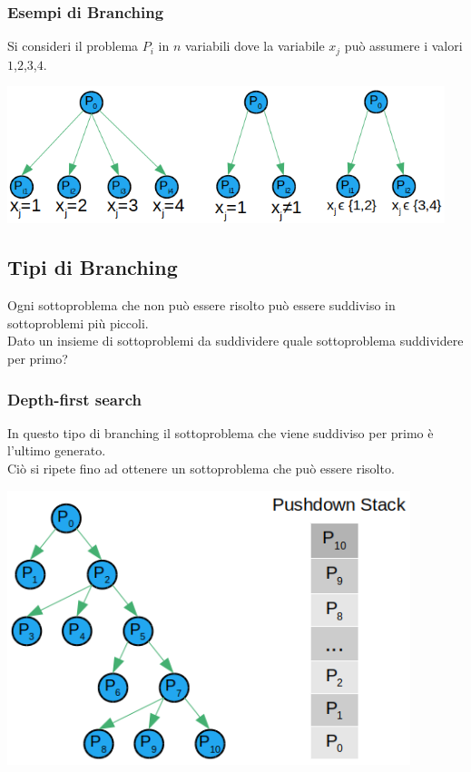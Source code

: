 \subsubsection{Esempi di Branching}
Si consideri il problema $P_{i}$ in $n$ variabili dove la variabile $x_{j}$ può assumere i valori $1$,$2$,$3$,$4$.
\centerline{\includegraphics[height=4cm]{images/graph16.png}}
\clearpage

\subsection{Tipi di Branching}
Ogni sottoproblema che non può essere risolto può essere suddiviso in sottoproblemi più piccoli.\\
Dato un insieme di sottoproblemi da suddividere quale sottoproblema suddividere per primo?
\subsubsection{Depth-first search}
In 	questo tipo di branching il sottoproblema che viene suddiviso per primo è l'ultimo generato.\\
Ciò si ripete fino ad ottenere un sottoproblema che può essere risolto.\\

\centerline{\includegraphics[height=8cm]{images/graph17.png}}

